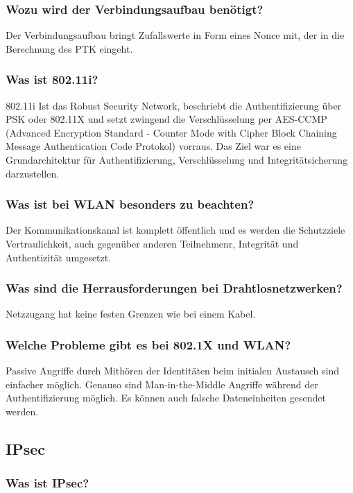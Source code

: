 	\subsubsection{Wozu wird der Verbindungsaufbau benötigt?}
	Der Verbindungsaufbau bringt Zufallswerte in Form eines Nonce mit, der in die Berechnung des PTK eingeht.	
		
		
	\subsubsection{Was ist 802.11i?}
	802.11i Ist das Robust Security Network, beschriebt die Authentifizierung über PSK oder 802.11X und setzt zwingend die Verschlüsselung per AES-CCMP (Advanced Encryption Standard - Counter Mode with Cipher Block Chaining Message Authentication Code Protokol) vorraus. Das Ziel war es eine Grundarchitektur für Authentifizierung, Verschlüsselung und Integritätsicherung darzustellen. 
	
	\subsubsection{Was ist bei WLAN besonders zu beachten?}
	Der Kommunikationskanal ist komplett öffentlich und es werden die Schutzziele Vertraulichkeit, auch gegenüber anderen Teilnehmenr, Integrität und Authentizität umgesetzt.
	
	\subsubsection{Was sind die Herrausforderungen bei Drahtlosnetzwerken?}
	Netzzugang hat keine festen Grenzen wie bei einem Kabel.
	
	\subsubsection{Welche Probleme gibt es bei 802.1X und WLAN?}
	Passive Angriffe durch Mithören der Identitäten beim initialen Austausch sind einfacher möglich. Genauso sind Man-in-the-Middle Angriffe während der Authentifizierung möglich. Es können auch falsche Dateneinheiten gesendet werden.
	
		\subsection{IPsec}
		

	
	\subsubsection{Was ist IPsec?}

